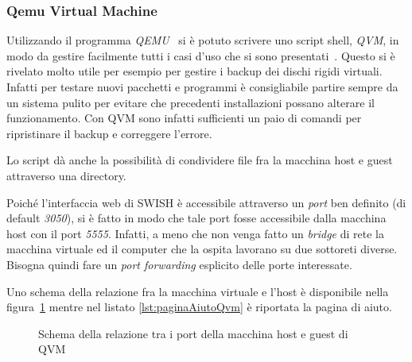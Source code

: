 \documentclass[10pt,titlepage,twoside,a4paper]{report}
\begin{document}
\subsubsection{Qemu Virtual Machine}
Utilizzando il programma \emph{QEMU}~\cite{qemu} si è potuto scrivere uno
script shell, \emph{QVM}, in modo da gestire facilmente tutti i casi d'uso che 
si sono presentati~\cite{qvm}. Questo si è rivelato molto utile per esempio per 
gestire i backup dei dischi rigidi virtuali. Infatti per testare nuovi 
pacchetti e programmi è consigliabile partire sempre da un sistema pulito
per evitare che precedenti installazioni possano alterare il funzionamento.
Con QVM sono infatti sufficienti un paio di comandi per ripristinare il 
backup e correggere l'errore.

Lo script dà anche la possibilità di condividere file fra la macchina host 
e guest attraverso una directory.

Poiché l'interfaccia web di SWISH è accessibile attraverso un \emph{port} 
ben definito (di default \emph{3050}), si è fatto in modo che tale port 
fosse accessibile dalla macchina host con il port \emph{5555}. Infatti, a meno 
che non venga fatto un \emph{bridge} di rete la macchina virtuale ed il 
computer che la ospita lavorano su due sottoreti diverse. Bisogna quindi fare
un \emph{port forwarding} esplicito delle porte interessate.

Uno schema della relazione fra la macchina virtuale e l'host è disponibile 
nella figura~\ref{fig:schemaPortsQvm} mentre nel listato 
\ref{lst:paginaAiutoQvm} è riportata la pagina di aiuto.

\begin{figure}[H]
\centering
\caption{Schema della relazione tra i port della macchina host e guest di QVM}
\label{fig:schemaPortsQvm}
\end{figure}
\end{document}
